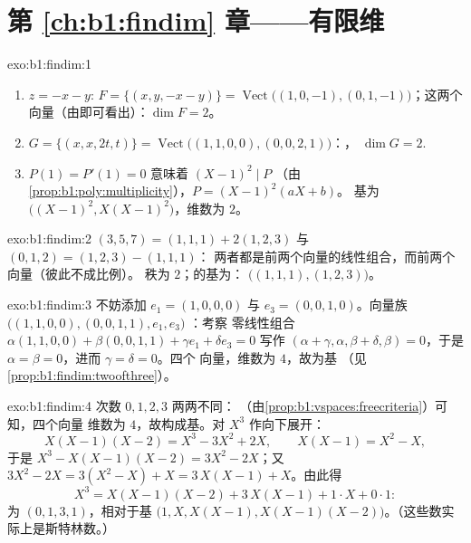 \section*{第 \ref{ch:b1:findim} 章——有限维}

\begin{solution}{exo:b1:findim:1}
\begin{enumerate}
  \item $z = -x - y$: $F = \{(x, y, -x-y)\} =
        \operatorname{Vect}\bigl((1,0,-1), (0,1,-1)\bigr)$；这两个
        向量（由即可看出）：$\dim F = 2$。
  \item $G = \{(x, x, 2t, t)\} =
        \operatorname{Vect}\bigl((1,1,0,0), (0,0,2,1)\bigr)$：，
        $\dim G = 2$.
  \item $P(1) = P'(1) = 0$ 意味着 $(X-1)^2 \mid P$
        （由\cref{prop:b1:poly:multiplicity}），$P = (X-1)^2(aX + b)$。
        基为 $\bigl((X-1)^2, X(X-1)^2\bigr)$，维数为 $2$。
\end{enumerate}
\end{solution}

\begin{solution}{exo:b1:findim:2}
$(3,5,7) = (1,1,1) + 2(1,2,3)$ 与 $(0,1,2) = (1,2,3) - (1,1,1)$：
两者都是前两个向量的线性组合，而前两个向量（彼此不成比例）。
秩为 $2$；的基为：
$\bigl((1,1,1), (1,2,3)\bigr)$。
\end{solution}

\begin{solution}{exo:b1:findim:3}
不妨添加 $e_1 = (1,0,0,0)$ 与 $e_3 = (0,0,1,0)$。向量族
$\bigl((1,1,0,0), (0,0,1,1), e_1, e_3\bigr)$ ：考察
零线性组合 $\alpha(1,1,0,0) + \beta(0,0,1,1) + \gamma e_1 + \delta
e_3 = 0$ 写作 $(\alpha + \gamma, \alpha, \beta + \delta, \beta) =
0$，于是 $\alpha = \beta = 0$，进而 $\gamma = \delta = 0$。四个
向量，维数为 $4$，故为基
        （见\cref{prop:b1:findim:twoofthree}）。
\end{solution}

\begin{solution}{exo:b1:findim:4}
次数 $0, 1, 2, 3$ 两两不同：
        （由\cref{prop:b1:vspaces:freecriteria}）可知，四个向量
维数为 $4$，故构成基。对 $X^3$ 作向下展开：
\[
X(X-1)(X-2) = X^3 - 3X^2 + 2X,
\qquad
X(X-1) = X^2 - X,
\]
于是 $X^3 - X(X-1)(X-2) = 3X^2 - 2X$；又 $3X^2 - 2X = 3(X^2 - X) + X
= 3\,X(X-1) + X$。由此得
\[
X^3 = X(X-1)(X-2) + 3\,X(X-1) + 1\cdot X + 0\cdot 1 :
\]
为 $(0, 1, 3, 1)$，相对于基 $\bigl(1, X, X(X-1),
X(X-1)(X-2)\bigr)$。（这些数实际上是斯特林数。）
\end{solution}

